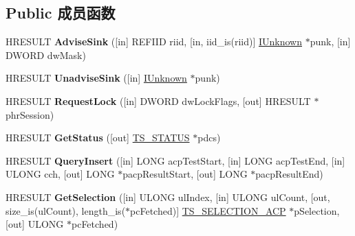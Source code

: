 \subsection*{Public 成员函数}
\begin{DoxyCompactItemize}
\item 
\mbox{\label{interface_i_text_store_a_c_p_a9059fbc71cabc797b6a38f68650b7246}} 
H\+R\+E\+S\+U\+LT {\bfseries Advise\+Sink} (\mbox{[}in\mbox{]} R\+E\+F\+I\+ID riid, \mbox{[}in, iid\+\_\+is(riid)\mbox{]} \hyperlink{interface_i_unknown}{I\+Unknown} $\ast$punk, \mbox{[}in\mbox{]} D\+W\+O\+RD dw\+Mask)
\item 
\mbox{\label{interface_i_text_store_a_c_p_aa687500a900a85bd81340bb9995e0a1f}} 
H\+R\+E\+S\+U\+LT {\bfseries Unadvise\+Sink} (\mbox{[}in\mbox{]} \hyperlink{interface_i_unknown}{I\+Unknown} $\ast$punk)
\item 
\mbox{\label{interface_i_text_store_a_c_p_ac5d70e072c2d187017528f8f2c661ef7}} 
H\+R\+E\+S\+U\+LT {\bfseries Request\+Lock} (\mbox{[}in\mbox{]} D\+W\+O\+RD dw\+Lock\+Flags, \mbox{[}out\mbox{]} H\+R\+E\+S\+U\+LT $\ast$phr\+Session)
\item 
\mbox{\label{interface_i_text_store_a_c_p_a53fafeeb2a1214c2c4683feaf781e89a}} 
H\+R\+E\+S\+U\+LT {\bfseries Get\+Status} (\mbox{[}out\mbox{]} \hyperlink{struct_t_s___s_t_a_t_u_s}{T\+S\+\_\+\+S\+T\+A\+T\+US} $\ast$pdcs)
\item 
\mbox{\label{interface_i_text_store_a_c_p_ac3f8e39b7fd907086c66a778158654ea}} 
H\+R\+E\+S\+U\+LT {\bfseries Query\+Insert} (\mbox{[}in\mbox{]} L\+O\+NG acp\+Test\+Start, \mbox{[}in\mbox{]} L\+O\+NG acp\+Test\+End, \mbox{[}in\mbox{]} U\+L\+O\+NG cch, \mbox{[}out\mbox{]} L\+O\+NG $\ast$pacp\+Result\+Start, \mbox{[}out\mbox{]} L\+O\+NG $\ast$pacp\+Result\+End)
\item 
\mbox{\label{interface_i_text_store_a_c_p_a209031ac02b10de276c725a6438b18be}} 
H\+R\+E\+S\+U\+LT {\bfseries Get\+Selection} (\mbox{[}in\mbox{]} U\+L\+O\+NG ul\+Index, \mbox{[}in\mbox{]} U\+L\+O\+NG ul\+Count, \mbox{[}out, size\+\_\+is(ul\+Count), length\+\_\+is($\ast$pc\+Fetched)\mbox{]} \hyperlink{struct_t_s___s_e_l_e_c_t_i_o_n___a_c_p}{T\+S\+\_\+\+S\+E\+L\+E\+C\+T\+I\+O\+N\+\_\+\+A\+CP} $\ast$p\+Selection, \mbox{[}out\mbox{]} U\+L\+O\+NG $\ast$pc\+Fetched)

\end{DoxyCompactItemize}
